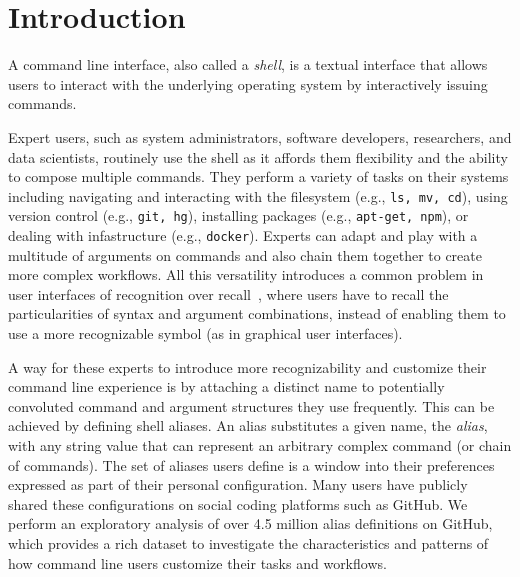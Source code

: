 \section{Introduction}

A command line interface, also called a \emph{shell}, is a textual interface that allows users to interact with the underlying operating system by interactively issuing commands.

Expert users, such as system administrators, software developers, researchers, and data scientists, routinely use the shell as it affords them flexibility and the ability to compose multiple commands.
They perform a variety of tasks on their systems including navigating and interacting with the filesystem (e.g., \verb|ls, mv, cd|), using version control (e.g., \verb|git, hg|), installing packages (e.g., \verb|apt-get, npm|), or dealing with infastructure (e.g., \verb|docker|).
Experts can adapt and play with a multitude of arguments on commands and also chain them together to create more complex workflows.
All this versatility introduces a common problem in user interfaces of recognition over recall~\cite{nielsen:05}, where users have to recall the particularities of syntax and argument combinations, instead of enabling them to use a more recognizable symbol (as in graphical user interfaces).

A way for these experts to introduce more recognizability and customize their command line experience is by attaching a distinct name to potentially convoluted command and argument structures they use frequently.
This can be achieved by defining shell aliases.
An alias substitutes a given name, the \emph{alias}, with any string value that can represent an arbitrary complex command (or chain of commands).
The set of aliases users define is a window into their preferences expressed as part of their personal configuration.
Many users have publicly shared these configurations on social coding platforms such as GitHub.
We perform an exploratory analysis of over 4.5 million alias definitions on GitHub, which provides a rich dataset to investigate the characteristics and patterns of how command line users customize their tasks and workflows.

